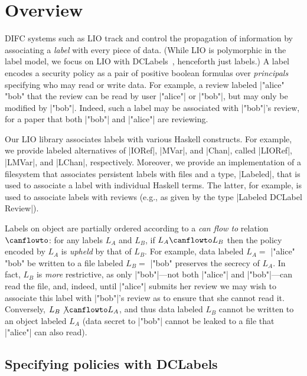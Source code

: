 \section{Overview}
\label{sec:overview}

DIFC systems such as LIO track and control the propagation of
information by associating a \emph{label} with every piece of data.
%
(While LIO is polymorphic in the label model, we focus on LIO with
DCLabels~\cite{dclabels}, henceforth just labels.)
%
A label encodes a security policy as a pair of positive boolean
formulas over \emph{principals} specifying who may read or write data.
%
For example, a review labeled \hs|"alice" \/ "bob" %
that the review can be read by user \hs|"alice"| or \hs|"bob"|, but
may only be modified by \hs|"bob"|.
%
Indeed, such a label may be associated with \hs|"bob"|'s review, for a
paper that both \hs|"bob"| and \hs|"alice"| are reviewing.
%

Our LIO library associates labels with various Haskell constructs.
%
For example, we provide labeled alternatives of \hs|IORef|, \hs|MVar|,
and \hs|Chan|, called \hs|LIORef|, \hs|LMVar|, and \hs|LChan|,
respectively.
%
Moreover, we provide an implementation of a filesystem that associates
persistent labels with files and a type, \hs|Labeled|, that is used to
associate a label with individual Haskell terms.
%
The latter, for example, is used to associate labels with reviews (e.g.,
as given by the type \hs|Labeled DCLabel Review|).

Labels on object are partially ordered according to a {\em can flow
  to} relation $\canflowto$: for any labels $L_A$ and $L_B$, if $L_A
  \canflowto L_B$ then the policy encoded by $L_A$ is \emph{upheld}
  by that of $L_B$.
%
For example, data labeled $L_A =$ \hs|"alice" \/ "bob" %
be written to a file labeled $L_B =$ \hs|"bob" %
preserves the secrecy of $L_A$.
%
In fact, $L_B$ is \emph{more} restrictive, as only
\hs|"bob"|---not both \hs|"alice"| and \hs|"bob"|---can read the file,
and, indeed, until \hs|"alice"| submits her review we may wish to
associate this label with \hs|"bob"|'s review as to ensure that she
cannot read it.
%
Conversely, $L_B \not\canflowto L_A$, and thus data labeled $L_B$
cannot be written to an object labeled $L_A$ (data secret to
\hs|"bob"| cannot be leaked to a file that \hs|"alice"| can also
read).


\subsection{Specifying policies with DCLabels}

